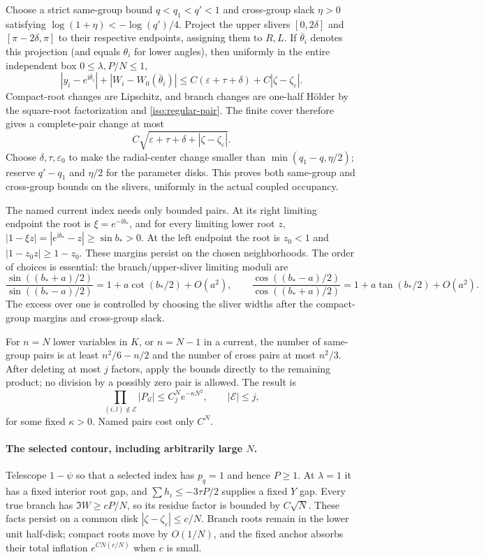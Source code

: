 \documentclass[11pt]{article}
\numberwithin{equation}{section}
\theoremstyle{definition}
\newcommand{\ii}{\mathrm i}
\newcommand{\eps}{\varepsilon}
\begin{document}
Choose a strict same-group bound $q<q_1<q'<1$ and cross-group slack
$\eta>0$ satisfying $\log(1+\eta)<-\log(q')/4$.
Project the upper slivers $[0,2\delta]$ and $[\pi-2\delta,\pi]$ to their
respective endpoints, assigning them to $R,L$. If $\bar\theta_i$ denotes
this projection (and equals $\theta_i$ for lower angles), then uniformly
in the entire independent box $0\le\lambda,P/N\le1$,
\[
 |y_i-e^{\ii\bar\theta_i}|+
 |W_i-W_0(\bar\theta_i)|
 \le C(\eps+\tau+\delta)+C|\zeta-\zeta_\eps|.
\]
Compact-root changes are Lipschitz, and branch changes are one-half
H\"older by the square-root factorization and
\eqref{iso:regular-pair}. The finite cover therefore gives a complete-pair
change at most
\[
 C\sqrt{\eps+\tau+\delta+|\zeta-\zeta_\eps|}.
\]
Choose $\delta,\tau,\eps_0$ to make the radial-center change smaller
than $\min(q_1-q,\eta/2)$; reserve $q'-q_1$ and $\eta/2$ for the
parameter disks. This proves both same-group and cross-group bounds
on the slivers, uniformly in the actual coupled occupancy.

The named current index needs only bounded pairs. At its right limiting
endpoint the root is $\xi=e^{-\ii b_*}$, and for every limiting lower root
$z$, $|1-\xi z|=|e^{\ii b_*}-z|\ge\sin b_*>0$.
At the left endpoint the root is $z_0<1$ and
$|1-z_0z|\ge1-z_0$. These margins persist on the chosen neighborhoods.
The order of choices is essential: the branch/upper-sliver limiting
moduli are
\[
 \frac{\sin((b_*+a)/2)}{\sin((b_*-a)/2)}
 =1+a\cot(b_*/2)+O(a^2),\qquad
 \frac{\cos((b_*-a)/2)}{\cos((b_*+a)/2)}
 =1+a\tan(b_*/2)+O(a^2).
\]
The excess over one is controlled by choosing the sliver widths after
the compact-group margins and cross-group slack.

For $n=N$ lower variables in $K$, or $n=N-1$ in a current, the number
of same-group pairs is at least $n^2/6-n/2$ and the number of cross pairs
at most $n^2/3$. After deleting at most $j$ factors, apply the bounds
directly to the remaining product; no division by a possibly zero pair
is allowed. The result is
\begin{equation}
 \prod_{(i,l)\notin\mathcal E}|P_{il}|
 \le C_j^N e^{-\kappa N^2},\qquad |\mathcal E|\le j,
 \label{iso:quadratic}
\end{equation}
for some fixed $\kappa>0$. Named pairs cost only $C^N$.

\paragraph{The selected contour, including arbitrarily large $N$.}
Telescope $1-\psi$ so that a selected index has $p_q=1$ and hence
$P\ge1$. At $\lambda=1$ it has a fixed interior root gap, and
$\sum h_i\le-3\tau P/2$ supplies a fixed $Y$ gap.
Every true branch has $\Im W\ge cP/N$, so its residue factor is
bounded by $C\sqrt N$. These facts persist on a common disk
$|\zeta-\zeta_\eps|\le c/N$. Branch roots remain in the lower unit
half-disk; compact roots move by $O(1/N)$, and the fixed anchor absorbs
their total inflation $e^{CN(c/N)}$ when $c$ is small.
\end{document}
